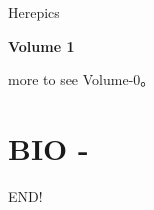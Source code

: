 \documentclass[a4paper,12pt,UTF8]{book}
\begin{document}
\author{dosconio}
\begin{center}
	\sc\fontsize{48pt}{0}\selectfont\textcolor[rgb]{1, 0, 0.618}{Herepics}
\end{center}

\hfill\textbf{Volume 1}

\newpage %
\renewcommand{\contentsname}{Contents}
\tableofcontents



more to see Volume-0。

\chapter{BIO \mbox{-} }



\newpage
END!
\end{document}
